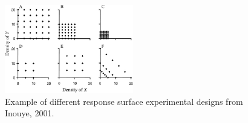 \documentclass[12pt]{article}\usepackage[]{graphicx}\usepackage[]{color}
\begin{document}
\begin{figure}[here]
\begin{center}
\includegraphics[width=0.5\textwidth]{..//figures/response_surface.jpg}
\caption{Example of different response surface experimental designs from Inouye, 2001.}
\label{fig:Figure 7}
\end{center}
\end{figure}

\end{document}
